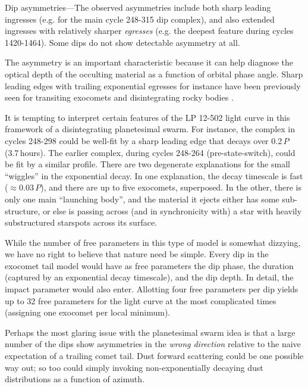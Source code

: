 \documentclass[11pt,twocolumn,tighten]{aastex63}
\begin{document}
{\sc Dip asymmetries}---The observed asymmetries include both sharp
leading ingresses (e.g. for the main cycle 248-315 dip complex), and
also extended ingresses with relatively sharper {\it egresses} (e.g.
the deepest feature during cycles 1420-1464).  Some dips do not show
detectable asymmetry at all.

The asymmetry is an important characteristic because it can help
diagnose the optical depth of the occulting material as a function of
orbital phase angle.  Sharp leading edges with trailing exponential
egresses for instance have been previously seen for transiting
exocomets and disintegrating rocky bodies
\citep[e.g.][]{2012ApJ...752....1R,2012A&A...545L...5B,2015Natur.526..546V,2019A&A...625L..13Z}.

It is tempting to interpret certain features of the LP 12-502 light
curve in this framework of a disintegrating planetesimal swarm.  For
instance, the complex in cycles 248-298 could be well-fit by a sharp
leading edge that decays over 0.2\,$P$ (3.7\,hours).  The earlier
complex, during cycles 248-264 (pre-state-switch), could be fit by a
similar profile.  There are two degenerate explanations for the small
``wiggles'' in the exponential decay.  In one explanation, the decay
timescale is fast ($\approx$0.03\,$P$), and there are up to five
exocomets, superposed.  In the other, there is only one main
``launching body'', and the material it ejects either has some
sub-structure, or else is passing across (and in synchronicity with) a
star with heavily substructured starspots across its surface.

While the number of free parameters in this type of model is somewhat
dizzying, we have no right to believe that nature need be
simple.  Every dip in the exocomet tail model would have as free
parameters the dip phase, the duration (captured by an exponential
decay timescale), and the dip depth.  In detail, the impact parameter
would also enter.  Allotting four free parameters per dip yields up to
32 free parameters for the light curve at the most complicated times
(assigning one exocomet per local minimum).

Perhaps the most glaring issue with the planetesimal swarm idea is
that a large number of the dips show asymmetries in the {\it wrong
direction} relative to the naive expectation of a trailing comet tail.
Dust forward scattering could be one possible way out; so too could
simply invoking non-exponentially decaying dust
distributions as a function of azimuth.
\end{document}
